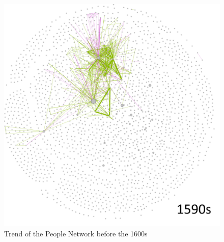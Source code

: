 \documentclass[12pt,a4paper,oneside]{book}
\begin{document}
\begin{sloppypar}
\begin{figure}[H]
\includegraphics[scale=0.4]{graph/People_1590s.png}
\caption{Trend of the People Network before the 1600s}
\label{fig:peoNetBefore1600}
\end{figure}


\end{sloppypar}
\end{document}

